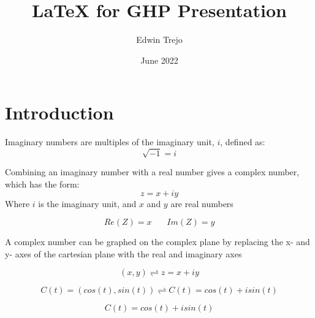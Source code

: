\documentclass{article}
\title{LaTeX for GHP Presentation}
\author{Edwin Trejo}
\date{June 2022}
\begin{document}
\maketitle

\section{Introduction}



Imaginary numbers are multiples of the imaginary unit, \(i\), defined as:
\[\sqrt{-1}=i\]

Combining an imaginary number with a real number gives a complex number, which has the form: \[z=x+iy\]
Where \(i\) is the imaginary unit, and \(x\) and \(y\) are real numbers
 
\[Re(Z) = x \ \ \ \ \ \ \ \  Im(Z) = y\]

A complex number can be graphed on the complex plane by replacing the x- and y- axes of the 
cartesian plane with the real and imaginary axes
\newline

\[(x,y) \rightleftharpoons z = x + iy\]

\[C(t) = (cos(t), sin(t)) \rightleftharpoons C(t) = cos(t) + isin(t)\]
\newline


\newpage
\[C(t) = cos(t) + isin(t)\]
\begin{center}
    \end{center}
\end{document}
